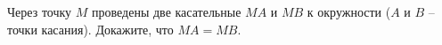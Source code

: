 \begin{ex}
	\begin{condition}
		Через точку \( M  \) проведены две касательные \( MA \) и \( MB  \) к окружности (\( A  \) и \( B \) – точки касания). Докажите, что \( MA = MB \).
	\end{condition}
\end{ex}